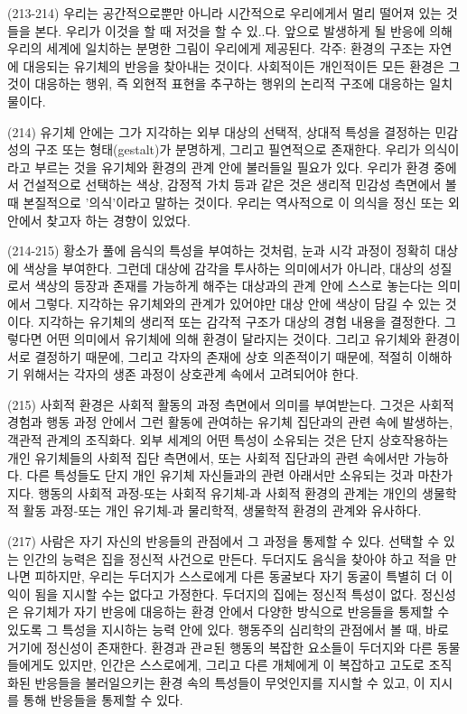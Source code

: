 \documentclass[12pt, a4paper]{article}
\begin{document}
(213-214) 우리는 공간적으로뿐만 아니라 시간적으로 우리에게서 멀리 떨어져 있는 것들을 본다. 우리가 이것을 할 때 저것을 할 수 있..다. 앞으로 발생하게 될 반응에 의해 우리의 세계에 일치하는 분명한 그림이 우리에게 제공된다. 각주: 환경의 구조는 자연에 대응되는 유기체의 반응을 찾아내는 것이다. 사회적이든 개인적이든 모든 환경은 그것이 대응하는 행위, 즉 외현적 표현을 추구하는 행위의 논리적 구조에 대응하는 일치물이다.

(214) 유기체 안에는 그가 지각하는 외부 대상의 선택적, 상대적 특성을 결정하는 민감성의 구조 또는 형태(gestalt)가 분명하게, 그리고 필연적으로 존재한다. 우리가 의식이라고 부르는 것을 유기체와 환경의 관계 안에 불러들일 필요가 있다. 우리가 환경 중에서 건설적으로 선택하는 색상, 감정적 가치 등과 같은 것은 생리적 민감성 측면에서 볼 때 본질적으로 '의식'이라고 말하는 것이다. 우리는 역사적으로 이 의식을 정신 또는 외 안에서 찾고자 하는 경향이 있었다.

(214-215) 황소가 풀에 음식의 특성을 부여하는 것처럼, 눈과 시각 과정이 정확히 대상에 색상을 부여한다. 그런데 대상에 감각을 투사하는 의미에서가 아니라, 대상의 성질로서 색상의 등장과 존재를 가능하게 해주는 대상과의 관계 안에 스스로 놓는다는 의미에서 그렇다. 지각하는 유기체와의 관계가 있어야만 대상 안에 색상이 담길 수 있는 것이다. 지각하는 유기체의 생리적 또는 감각적 구조가 대상의 경험 내용을 결정한다. 그렇다면 어떤 의미에서 유기체에 의해 환경이 달라지는 것이다. 그리고 유기체와 환경이 서로 결정하기 때문에, 그리고 각자의 존재에 상호 의존적이기 때문에, 적절히 이해하기 위해서는 각자의 생존 과정이 상호관계 속에서 고려되어야 한다. 

(215) 사회적 환경은 사회적 활동의 과정 측면에서 의미를 부여받는다. 그것은 사회적 경험과 행동 과정 안에서 그런 활동에 관여하는 유기체 집단과의 관련 속에 발생하는, 객관적 관계의 조직화다. 외부 세계의 어떤 특성이 소유되는 것은 단지 상호작용하는 개인 유기체들의 사회적 집단 측면에서, 또는 사회적 집단과의 관련 속에서만 가능하다. 다른 특성들도 단지 개인 유기체 자신들과의 관련 아래서만 소유되는 것과 마찬가지다. 행동의 사회적 과정-또는 사회적 유기체-과 사회적 환경의 관계는 개인의 생물학적 활동 과정-또는 개인 유기체-과 물리학적, 생물학적 환경의 관계와 유사하다.

(217) 사람은 자기 자신의 반응들의 관점에서 그 과정을 통제할 수 있다. 선택할 수 있는 인간의 능력은 집을 정신적 사건으로 만든다. 두더지도 음식을 찾아야 하고 적을 만나면 피하지만, 우리는 두더지가 스스로에게 다른 동굴보다 자기 동굴이 특별히 더 이익이 됨을 지시할 수는 없다고 가정한다. 두더지의 집에는 정신적 특성이 없다. 정신성은 유기체가 자기 반응에 대응하는 환경 안에서 다양한 방식으로 반응들을 통제할 수 있도록 그 특성을 지시하는 능력 안에 있다. 행동주의 심리학의 관점에서 볼 때, 바로 거기에 정신성이 존재한다. 환경과 관ㄹ된 행동의 복잡한 요소들이 두더지와 다른 동물들에게도 있지만, 인간은 스스로에게, 그리고 다른 개체에게 이 복잡하고 고도로 조직화된 반응들을 불러일으키는 환경 속의 특성들이 무엇인지를 지시할 수 있고, 이 지시를 통해 반응들을 통제할 수 있다. 
\end{document}
